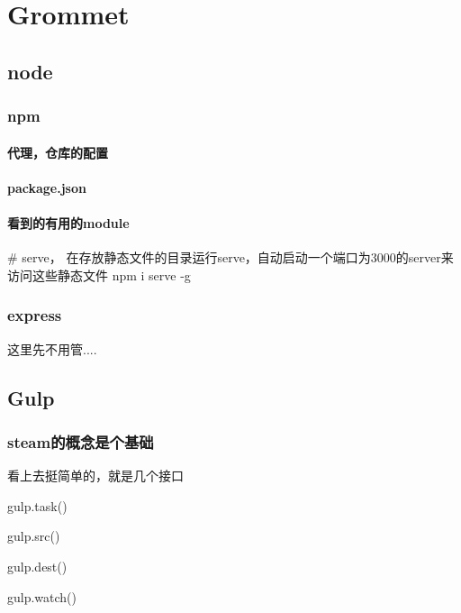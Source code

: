\chapter{Grommet}

\section{node}

\subsection{npm}

\subsubsection{代理，仓库的配置}

\subsubsection{package.json}

\subsubsection{看到的有用的module}

\begin{Bash}

# serve， 在存放静态文件的目录运行serve，自动启动一个端口为3000的server来访问这些静态文件
npm i serve -g


\end{Bash}

\subsection{express}

这里先不用管....

\section{Gulp}

\subsection{steam的概念是个基础}

看上去挺简单的，就是几个接口

\begin{JavaScript}[Gulp]

gulp.task()

gulp.src()

gulp.dest()

gulp.watch()

\end{JavaScript}


